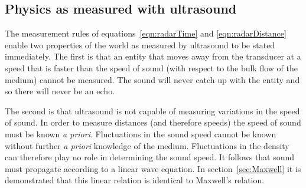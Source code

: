 \documentclass[10pt, fleqn,final,showtrims,oldfontcommands]{article} %
\newcommand{\secref}[1]{section~\ref{sec:#1}}
\begin{document}




\subsection{Physics as measured with ultrasound}

The measurement rules of equations~\ref{eqn:radarTime} and \ref{eqn:radarDistance} enable two properties of the world as measured by ultrasound to be stated immediately.
The first is that an entity that moves away from the transducer at a speed that is faster than the speed of sound (with respect to the bulk flow of the medium) 
cannot be measured.  
The sound will never catch  up with the entity and so there will never be an echo.

The second is that ultrasound is not capable of  measuring variations in the speed of sound.
In order to measure distances (and therefore speeds) the speed of sound must be known {\em a priori}.
Fluctuations in the sound speed  cannot be known without further {\em a priori} knowledge of the medium. 
Fluctuations in the density  can therefore play no role in determining the sound speed. %
It follows that sound must propagate according to a linear wave equation. %
In \secref{Maxwell} it is demonstrated that this linear relation is identical to Maxwell's relation.
\end{document}
